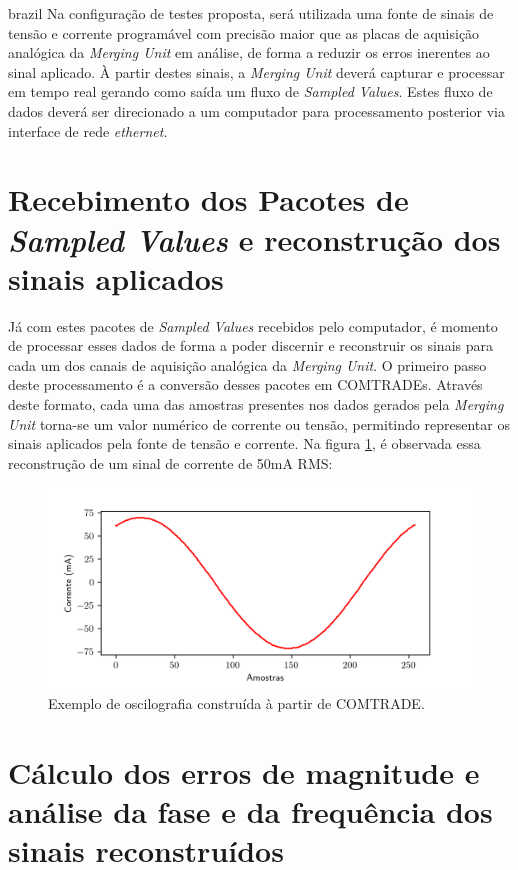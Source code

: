 \begin{otherlanguage*}{brazil}
Na configuração de testes proposta, será utilizada uma fonte de sinais de tensão e corrente programável com precisão maior que as placas de aquisição analógica da \textit{Merging Unit} em análise, de forma a reduzir os erros inerentes ao  sinal aplicado. À partir destes sinais, a \textit{Merging Unit} deverá capturar e processar em tempo real gerando como saída um fluxo de \textit{Sampled Values}. Estes fluxo de dados deverá ser direcionado a um computador para processamento posterior via interface de rede \textit{ethernet}.

\section{Recebimento dos Pacotes de \textit{Sampled Values} e reconstrução dos sinais aplicados}

Já com estes pacotes de \textit{Sampled Values} recebidos pelo computador, é momento de processar esses dados de forma a poder discernir e reconstruir os sinais para cada um dos canais de aquisição analógica da \textit{Merging Unit}. O primeiro passo deste processamento é a conversão desses pacotes em COMTRADEs. Através deste formato, cada uma das amostras presentes nos dados gerados pela \textit{Merging Unit} torna-se um valor numérico de corrente ou tensão, permitindo representar os sinais aplicados pela fonte de tensão e corrente. Na figura \ref{fig:sig_corr_reconst}, é observada essa reconstrução de um sinal de corrente de 50mA RMS:

\begin{figure}[H]
    \centering
    \includegraphics[width=14cm]{pictures/sig_corr_reconst.png}
    \caption{Exemplo de oscilografia construída à partir de COMTRADE.}
    \label{fig:sig_corr_reconst}
\end{figure}

\section{Cálculo dos erros de magnitude e análise da fase e da frequência dos sinais reconstruídos}


\end{otherlanguage*}
